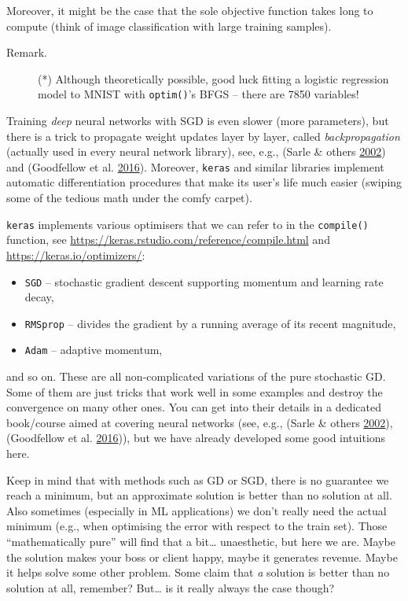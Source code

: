 \documentclass[10pt,b5paper,krantz1]{krantz}
\begin{document}
Moreover, it might be the case that the sole objective function takes long
to compute (think of image classification with large training samples).

\begin{description}
\item[Remark.]
(*) Although theoretically possible, good luck
fitting a logistic regression model to MNIST with \texttt{optim()}'s BFGS -- there are 7850 variables!
\end{description}

Training \emph{deep} neural networks with SGD is even slower (more parameters),
but there is a trick to propagate weight updates layer by layer,
called \emph{backpropagation} (actually used in every neural network library),
see, e.g., (Sarle \& others \protect\hyperlink{ref-aifaq}{2002}) and (Goodfellow et al. \protect\hyperlink{ref-deeplearn}{2016}).
Moreover, \texttt{keras} and similar libraries implement automatic differentiation
procedures that make its user's life much easier (swiping some of the tedious
math under the comfy carpet).

\bigskip

\texttt{keras} implements various optimisers that
we can refer to in the \texttt{compile()} function,
see
\url{https://keras.rstudio.com/reference/compile.html}
and
\url{https://keras.io/optimizers/}:

\begin{itemize}
\item
  \texttt{SGD} -- stochastic gradient descent supporting momentum and learning rate decay,
\item
  \texttt{RMSprop} -- divides the gradient by a running average of its recent magnitude,
\item
  \texttt{Adam} -- adaptive momentum,
\end{itemize}

and so on. These are all non-complicated variations of the pure stochastic GD.
Some of them are just tricks that work well in some examples and destroy
the convergence on many other ones.
You can get into their details in a dedicated book/course aimed at covering
neural networks (see, e.g., (Sarle \& others \protect\hyperlink{ref-aifaq}{2002}), (Goodfellow et al. \protect\hyperlink{ref-deeplearn}{2016})),
but we have already developed some
good intuitions here.

\bigskip

Keep in mind that with methods such as GD or SGD, there is no guarantee we reach a minimum,
but an approximate solution is better than no solution at all.
Also sometimes (especially in ML applications)
we don't really need the actual minimum (e.g., when optimising
the error with respect to the train set).
Those ``mathematically pure'' will find that a bit\ldots{} unaesthetic,
but here we are. Maybe the solution makes your boss or client happy,
maybe it generates revenue. Maybe it helps solve some other problem.
Some claim that \emph{a} solution is better than no solution at all, remember?
But\ldots{} is it really always the case though?
\end{document}
